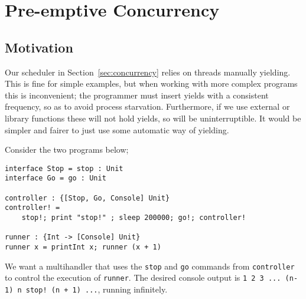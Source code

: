 \documentclass[msc,deptreport,cs]{infthesis} %
\newcommand{\code}[1]{\lstinline{#1}}
\newcommand\yield{\textsf{yield}\xspace}
\newcommand{\todo}[1]
           {{\par\noindent\small\color{RoyalPurple}
  \framebox{\parbox{\dimexpr\linewidth-2\fboxsep-2\fboxrule}
    {\textbf{TODO:} #1}}}}
\begin{document}
\chapter{Pre-emptive Concurrency}
\label{chap:preemptive-concurrency}

\section{Motivation}
\label{sec:interrupt-motivation}

Our scheduler in Section~\ref{sec:concurrency} relies on threads manually
\yield{}ing. This is fine for simple examples, but when working with more
complex programs this is inconvenient; the programmer must insert \yield{}s with
a consistent frequency, so as to avoid process starvation. Furthermore, if we
use external or library functions these will not hold yields, so will be
uninterruptible. It would be simpler and fairer to just use some automatic way of
\yield{}ing.

\todo{Redo above}


Consider the two programs below;

\begin{lstlisting}
interface Stop = stop : Unit
interface Go = go : Unit

controller : {[Stop, Go, Console] Unit}
controller! =
    stop!; print "stop!" ; sleep 200000; go!; controller!

runner : {Int -> [Console] Unit}
runner x = printInt x; runner (x + 1)
\end{lstlisting}


\noindent We want a multihandler that uses the \code{stop} and \code{go}
commands from \code{controller} to control the execution of \code{runner}. The desired console output is \code{1 2 3 ... (n-1) n stop! (n + 1) ...}, running infinitely.
\end{document}
